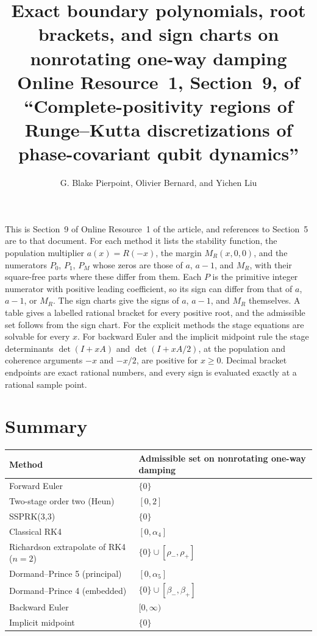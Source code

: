 \documentclass[11pt]{article}
\title{Exact boundary polynomials, root brackets, and sign charts on nonrotating one-way damping\\[4pt]\large Online Resource~1, Section~9, of ``Complete-positivity regions of Runge--Kutta discretizations of phase-covariant qubit dynamics''}
\author{G. Blake Pierpoint, Olivier Bernard, and Yichen Liu}
\date{}
\begin{document}
\maketitle
This is Section~9 of Online Resource~1 of the article, and references to Section~5 are to that document. For each method it lists the stability function, the population multiplier $a(x)=R(-x)$, the margin $M_R(x,0,0)$, and the numerators $P_0$, $P_1$, $P_M$ whose zeros are those of $a$, $a-1$, and $M_R$, with their square-free parts where these differ from them. Each $P$ is the primitive integer numerator with positive leading coefficient, so its sign can differ from that of $a$, $a-1$, or $M_R$. The sign charts give the signs of $a$, $a-1$, and $M_R$ themselves. A table gives a labelled rational bracket for every positive root, and the admissible set follows from the sign chart. For the explicit methods the stage equations are solvable for every $x$. For backward Euler and the implicit midpoint rule the stage determinants $\det(I+xA)$ and $\det(I+xA/2)$, at the population and coherence arguments $-x$ and $-x/2$, are positive for $x\ge0$. Decimal bracket endpoints are exact rational numbers, and every sign is evaluated exactly at a rational sample point.

\section{Summary}
\begin{center}
\begin{tabular}{@{}ll@{}}
\toprule
Method & Admissible set on nonrotating one-way damping \\
\midrule
Forward Euler & $\{0\}$ \\
Two-stage order two (Heun) & $[0,2]$ \\
SSPRK(3,3) & $\{0\}$ \\
Classical RK4 & $[0,\alpha_4]$ \\
Richardson extrapolate of RK4 ($n=2$) & $\{0\}\cup[\rho_-,\rho_+]$ \\
Dormand--Prince 5 (principal) & $[0,\alpha_5]$ \\
Dormand--Prince 4 (embedded) & $\{0\}\cup[\beta_-,\beta_+]$ \\
Backward Euler & $[0,\infty)$ \\
Implicit midpoint & $\{0\}$ \\
\bottomrule
\end{tabular}
\end{center}
\end{document}
